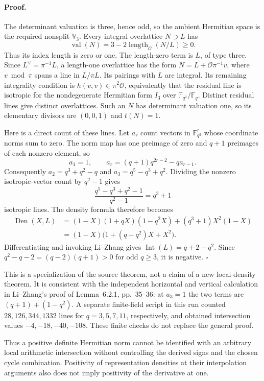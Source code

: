 \documentclass[11pt]{article}
\theoremstyle{definition}\newtheorem{definition}[theorem]{Definition}\newtheorem{remark}[theorem]{Remark}
\begin{document}
\paragraph{Proof.}
The determinant valuation is three, hence odd, so the ambient
Hermitian space is the required nonsplit $\mathbb V_3$. Every
integral overlattice $N\supset L$ has
\[
 \operatorname{val}(N)=3-2\operatorname{length}_{\mathcal O}(N/L)
 \geq0.
\]
Thus its index length is zero or one. The length-zero term is $L$,
of type three. Since $L^\vee=\pi^{-1}L$, a length-one overlattice
has the form $N=L+\mathcal O\pi^{-1}v$, where $v\bmod\pi$ spans
a line in $L/\pi L$. Its pairings with $L$ are integral. Its
remaining integrality condition is
$h(v,v)\in\pi^2\mathcal O$, equivalently that the residual line
is isotropic for the nondegenerate Hermitian form $I_3$ over
$\mathbb F_{q^2}/\mathbb F_q$. Distinct residual lines give
distinct overlattices. Such an $N$ has determinant valuation one,
so its elementary divisors are $(0,0,1)$ and $t(N)=1$.

Here is a direct count of these lines. Let $a_r$ count vectors in
$\mathbb F_{q^2}^r$ whose coordinate norms sum to zero. The norm
map has one preimage of zero and $q+1$ preimages of each nonzero
element, so
\[
 a_1=1,\qquad
 a_r=(q+1)q^{2r-2}-q a_{r-1}.
\]
Consequently $a_2=q^3+q^2-q$ and $a_3=q^5-q^3+q^2$. Dividing the
nonzero isotropic-vector count by $q^2-1$ gives
\[
 \frac{q^5-q^3+q^2-1}{q^2-1}=q^3+1
\]
isotropic lines. The density formula therefore becomes
\begin{align*}
 \operatorname{Den}(X,L)
 &=(1-X)(1+qX)(1-q^2X)+(q^3+1)X^2(1-X)\\
 &=(1-X)\bigl(1+(q-q^2)X+X^2\bigr).
\end{align*}
Differentiating and invoking Li--Zhang gives
$\operatorname{Int}(L)=q+2-q^2$. Since
$q^2-q-2=(q-2)(q+1)>0$ for odd $q\geq3$, it is negative.
$\square$

This is a specialization of the source theorem, not a claim of a
new local-density theorem. It is consistent with the independent
horizontal and vertical calculation in Li--Zhang's proof of
Lemma~6.2.1, pp.~35--36: at $a_3=1$ the two terms are
$(q+1)+(1-q^2)$. A separate finite-field script in this run counted
$28,126,344,1332$ lines for $q=3,5,7,11$, respectively, and obtained
intersection values $-4,-18,-40,-108$. These finite checks do not
replace the general proof.

Thus a positive definite Hermitian norm cannot be identified with
an arbitrary local arithmetic intersection without controlling the
derived signs and the chosen cycle combination. Positivity of
representation densities at their interpolation arguments also
does not imply positivity of the derivative at one.
\end{document}
